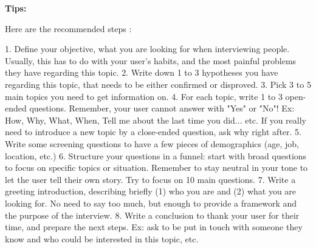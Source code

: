 \textbf{Tips:}

Here are the recommended steps :

1. Define your objective, what you are looking for when interviewing people. Usually, this has to do with your user's habits, and the most painful problems they have regarding this topic.
2. Write down 1 to 3 hypotheses you have regarding this topic, that needs to be either confirmed or disproved.
3. Pick 3 to 5 main topics you need to get information on.
4. For each topic, write 1 to 3 open-ended questions. Remember, your user cannot answer with "Yes" or "No"! Ex: How, Why, What, When, Tell me about the last time you did... etc. If you really need to introduce a new topic by a close-ended question, ask why right after.
5. Write some screening questions to have a few pieces of demographics (age, job, location, etc.)
6. Structure your questions in a funnel: start with broad questions to focus on specific topics or situation. Remember to stay neutral in your tone to let the user tell their own story. Try to focus on 10 main questions.
7. Write a greeting introduction, describing briefly (1) who you are and (2) what you are looking for. No need to say too much, but enough to provide a framework and the purpose of the interview.
8. Write a conclusion to thank your user for their time, and prepare the next steps. Ex: ask to be put in touch with someone they know and who could be interested in this topic, etc.


